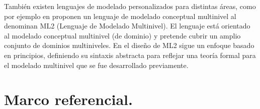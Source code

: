 También existen lenguajes de modelado personalizados para distintas áreas, como por ejemplo en \cite{Multi-level} proponen un lenguaje de modelado conceptual multinivel al denominan ML2 (Lenguaje de Modelado Multinivel). El lenguaje está orientado al modelado conceptual multinivel (de dominio) y pretende cubrir un amplio conjunto de dominios multiniveles. En el diseño de ML2 sigue un enfoque basado en principios, definiendo su sintaxis abstracta para reflejar una teoría formal para el modelado multinivel que se fue desarrollado previamente.


\section{Marco referencial.}